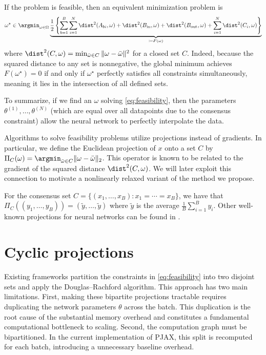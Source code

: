\documentclass{article}
\let\cref\crtcref
\begin{document}
If the problem is feasible, then an equivalent minimization problem is
\[
    \omega^\star \in \argmin_{\omega\in\Omega} \underbrace{\frac{1}{2}\left\{\sum_{b=1}^B \sum_{i=1}^N \dist^2(A_{bi}, \omega)   + \dist^2(B_{\rm in}, \omega) + \dist^2(B_{\rm out}, \omega) + \sum_{i=1}^N \dist^2(C_i, \omega)\right\}}_{\coloneqq F(\omega)}
\]
where $\dist^2(C, \omega) = \min_{\bar\omega\in C} \|\omega - \bar\omega\|^2$ for a closed set $C$. Indeed, because the squared distance to any set is nonnegative, the global minimum achieves $F(\omega^\star) = 0$ if and only if $\omega^\star$ perfectly satisfies all constraints simultaneously, meaning it lies in the intersection of all defined sets.
\label{sec:feasibility}
\vspace{0.5em}
\begin{tcolorbox}
To summarize, if we find an $\omega$ solving \eqref{eq:feasibility}, then the parameters $\theta^{(1)}, \ldots, \theta^{(N)}$ (which are equal over all datapoints due to the consensus constraint) allow the neural network to perfectly interpolate the data.
\end{tcolorbox}
\vspace{0.5em}

Algorithms to solve feasibility problems utilize projections instead of gradients. In particular, we define the Euclidean projection of $x$ onto a set $C$ by $\Pi_C(\omega) = \argmin_{\bar \omega\in C} \|\omega - \bar\omega\|_2$. This operator is known to be related to the gradient of the squared distance $\dist^2(C,\omega)$. We will later exploit this connection to motivate a nonlinearly relaxed variant of the method we propose.

\begin{example} \label{ex:consensus}
    For the consensus set $C = \{(x_1, \ldots, x_B) : x_1 = \cdots = x_B\}$, we have that $\Pi_C((y_1, \ldots, y_B)) = (\tilde y, \ldots, \tilde y)$ where $\tilde y$ is the average $\frac{1}{B}\sum_{i=1}^B y_i$. Other well-known projections for neural networks can be found in \cref{sec:projections}.
\end{example}

\section{Cyclic projections}
Existing frameworks \cite{elser2019learning,bergmeister2025projection} partition the constraints in \eqref{eq:feasibility} into two disjoint sets and apply the Douglas--Rachford algorithm. This approach has two main limitations. First, making these bipartite projections tractable requires duplicating the network parameters $\theta$ across the batch. This duplication is the root cause of the substantial memory overhead and constitutes a fundamental computational bottleneck to scaling. Second, the computation graph must be bipartitioned. In the current implementation of PJAX, this split is recomputed for each batch, introducing a unnecessary baseline overhead.
\end{document}
